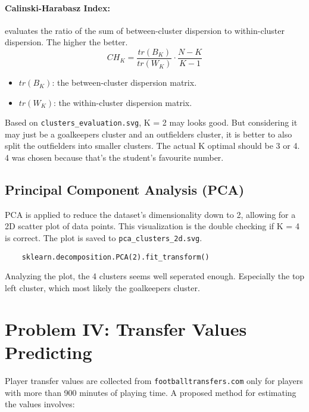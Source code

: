 \documentclass{report}
\begin{document}
\paragraph{Calinski-Harabasz Index:}  evaluates the ratio of the sum of between-cluster dispersion to 
within-cluster dispersion. The higher the better.
\[ CH_K = \frac{tr(B_K)}{tr(W_K)} \cdot \frac{N - K}{K - 1} \]
\begin{itemize}
    \item \( tr(B_K) \): the between-cluster dispersion matrix.
    \item \( tr(W_K) \): the within-cluster dispersion matrix.
\end{itemize}

\noindent Based on \verb|clusters_evaluation.svg|, K = 2 may looks good. But considering it may just be a 
goalkeepers cluster and an outfielders cluster, it is better to also split the outfielders into smaller
clusters. The actual K optimal should be 3 or 4. 4 was chosen because that's the student's favourite 
number. %

\subsection{Principal Component Analysis (PCA)}
PCA is applied to reduce the dataset's dimensionality down to 2, allowing for a 2D scatter plot of data 
points. This visualization is the double checking if K = 4 is correct. The plot is saved to 
\verb|pca_clusters_2d.svg|.
\begin{verbatim}
    sklearn.decomposition.PCA(2).fit_transform()
\end{verbatim}
Analyzing the plot, the 4 clusters seems well seperated enough. Especially the top left cluster, which
most likely the goalkeepers cluster.

\section{Problem IV: Transfer Values Predicting}
Player transfer values are collected from \verb|footballtransfers.com| only for players with more than 
900 minutes of playing time. A proposed method for estimating the values involves:
\end{document}
